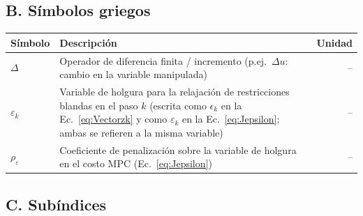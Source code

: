 \bigskip

\subsection*{B. Símbolos griegos}

\begin{tabularx}{\textwidth}{@{} l X r @{}}
\toprule
\textbf{Símbolo} & \textbf{Descripción} & \textbf{Unidad} \\
\midrule

$\Delta$
  & Operador de diferencia finita / incremento (p.ej.\ $\Delta u$: cambio en la variable manipulada)
  & -- \\

$\varepsilon_k$
  & Variable de holgura para la relajación de restricciones blandas en el paso $k$
    (escrita como $\epsilon_k$ en la Ec.~\ref{eq:Vectorzk} y como $\varepsilon_k$ en la Ec.~\ref{eq:Jepsilon};
    ambas se refieren a la misma variable)
  & -- \\

$\rho_{\varepsilon}$
  & Coeficiente de penalización sobre la variable de holgura en el costo MPC (Ec.~\ref{eq:Jepsilon})
  & -- \\

\bottomrule
\end{tabularx}

\bigskip

\subsection*{C. Subíndices}


